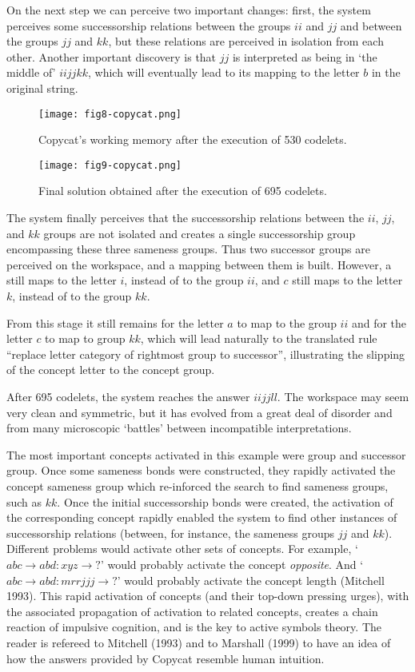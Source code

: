 \documentclass[a4paper]{article}
\begin{document}
On the next step we can perceive two important changes:  first, the system perceives some successorship relations between the groups $ii$ and $jj$ and between the groups $jj$ and $kk$, but these relations are perceived in isolation from each other.    Another important discovery is that $jj$ is interpreted as being in `the middle of' $iijjkk$, which will eventually lead to its mapping to the letter $b$ in the original string.


\begin{figure}
\centering
\texttt{[image: fig8-copycat.png]}
\caption{\label{fig:f8}Copycat’s working memory after the execution of 530 codelets.}
\end{figure}


\begin{figure}
\centering
\texttt{[image: fig9-copycat.png]}
\caption{\label{fig:f9}Final solution obtained after the execution of 695 codelets.}
\end{figure}


The system finally perceives that the successorship relations between the $ii$, $jj$, and $kk$ groups are not isolated and creates a single successorship group encompassing these three sameness groups.  Thus two successor groups are perceived on the workspace, and a mapping between them is built. However, a still maps to the letter $i$, instead of to the group $ii$, and $c$ still maps to the letter $k$, instead of to the group $kk$.

From this stage it still remains for the letter $a$ to map to the group $ii$ and for the letter $c$ to map to group $kk$, which will lead naturally to the translated rule ``replace letter category of rightmost group to successor'', illustrating the slipping of the concept letter to the concept group.

After 695 codelets, the system reaches the answer $iijjll$.  The workspace may seem very clean and symmetric, but it has evolved from a great deal of disorder and from many microscopic `battles' between incompatible interpretations.  

The most important concepts activated in this example were group and successor group.  Once some sameness bonds were constructed, they rapidly activated the concept sameness group which re-inforced the search to find sameness groups, such as $kk$.  Once the initial successorship bonds were created, the activation of the corresponding concept rapidly enabled the system to find other instances of successorship relations (between, for instance, the sameness groups $jj$ and $kk$).  Different problems would activate other sets of concepts.  For example, `$abc\to abd: xyz\to ?$’ would probably activate the concept \emph{opposite}. And `$abc\to abd: mrrjjj\to ?$' would probably activate the concept length (Mitchell 1993). This rapid activation of concepts (and their top-down pressing urges), with the associated propagation of activation to related concepts, creates a chain reaction of impulsive cognition, and is the key to active symbols theory.  The reader is refereed to Mitchell (1993) and to Marshall (1999) to have an idea of how the answers provided by Copycat resemble human intuition.  
\end{document}
